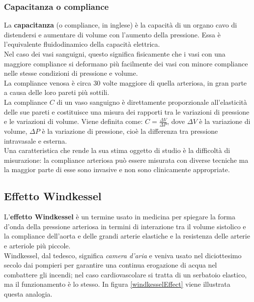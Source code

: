 \newpage
\subsubsection{Capacitanza o compliance}\label{capacitanza}
La \textbf{capacitanza} (o compliance, in inglese) è la capacità di un organo cavo di distendersi e aumentare di volume con l'aumento della pressione. Essa è l'equivalente fluidodinamico della capacità elettrica.\\
Nel caso dei vasi sanguigni, questo significa fisicamente che i vasi con una maggiore compliance si deformano più facilmente dei vasi con minore compliance nelle stesse condizioni di pressione e volume. \\
La compliance venosa è circa 30 volte maggiore di quella arteriosa, in gran parte a causa delle loro pareti più sottili.\\
La compliance $C$ di un vaso sanguigno è direttamente proporzionale all'elasticità delle sue pareti e costituisce una misura dei rapporti tra le variazioni di pressione e le variazioni di volume. Viene definita come: $C=\frac{\Delta V}{\Delta P}$, dove $\Delta V$ è la variazione di volume, $\Delta P$ è la variazione di pressione, cioè la differenza tra pressione intravasale e esterna.\\
Una caratteristica che rende la sua stima oggetto di studio è la difficoltà di misurazione: la compliance arteriosa può essere misurata con diverse tecniche ma la maggior parte di esse sono invasive e non sono clinicamente appropriate. 

\subsection{Effetto Windkessel}
L'\textbf{effetto Windkessel} è un termine usato in medicina per spiegare la forma d'onda della pressione arteriosa in termini di interazione tra il volume sistolico e la compliance dell'aorta e delle grandi arterie elastiche e la resistenza delle arterie e arteriole più piccole.\\
Windkessel, dal tedesco, significa \textit{camera d'aria} e veniva usato nel diciottesimo secolo dai pompieri per garantire una continua erogazione di acqua nel combattere gli incendi; nel caso cardiovascolare si tratta di un serbatoio elastico, ma il funzionamento è lo stesso. In figura \ref{windkesselEffect} viene illustrata questa analogia.


